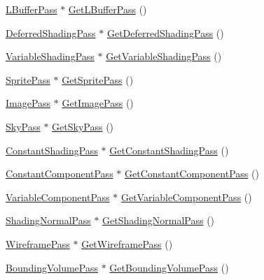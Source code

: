 \begin{DoxyCompactItemize}
\item 
\hyperlink{structmage_1_1_l_buffer_pass}{L\+Buffer\+Pass} $\ast$ \hyperlink{classmage_1_1_scene_renderer_a19c08ea8c46fac8ca0fcef156f4a0488}{Get\+L\+Buffer\+Pass} ()
\item 
\hyperlink{classmage_1_1_deferred_shading_pass}{Deferred\+Shading\+Pass} $\ast$ \hyperlink{classmage_1_1_scene_renderer_aa0a9b451bdb7b96672bece024f733178}{Get\+Deferred\+Shading\+Pass} ()
\item 
\hyperlink{classmage_1_1_variable_shading_pass}{Variable\+Shading\+Pass} $\ast$ \hyperlink{classmage_1_1_scene_renderer_a1eb6332a375e6f8273c26223c832d22c}{Get\+Variable\+Shading\+Pass} ()
\item 
\hyperlink{classmage_1_1_sprite_pass}{Sprite\+Pass} $\ast$ \hyperlink{classmage_1_1_scene_renderer_a5a7c407e308d6f449b8cbee08794d8bd}{Get\+Sprite\+Pass} ()
\item 
\hyperlink{classmage_1_1_image_pass}{Image\+Pass} $\ast$ \hyperlink{classmage_1_1_scene_renderer_a9bd8910a13b4711e90bdd689df8b4854}{Get\+Image\+Pass} ()
\item 
\hyperlink{classmage_1_1_sky_pass}{Sky\+Pass} $\ast$ \hyperlink{classmage_1_1_scene_renderer_a4084ba56458ae0678b0d970ceb87cbd0}{Get\+Sky\+Pass} ()
\item 
\hyperlink{classmage_1_1_constant_shading_pass}{Constant\+Shading\+Pass} $\ast$ \hyperlink{classmage_1_1_scene_renderer_a26f35273609c8850b37f2e78a7c4af32}{Get\+Constant\+Shading\+Pass} ()
\item 
\hyperlink{classmage_1_1_constant_component_pass}{Constant\+Component\+Pass} $\ast$ \hyperlink{classmage_1_1_scene_renderer_abc8019f567221458382aedabc4c1d651}{Get\+Constant\+Component\+Pass} ()
\item 
\hyperlink{classmage_1_1_variable_component_pass}{Variable\+Component\+Pass} $\ast$ \hyperlink{classmage_1_1_scene_renderer_a9537cbf602aa7bfa5f197812683bfb37}{Get\+Variable\+Component\+Pass} ()
\item 
\hyperlink{classmage_1_1_shading_normal_pass}{Shading\+Normal\+Pass} $\ast$ \hyperlink{classmage_1_1_scene_renderer_a5982de896a340dd69c26496f186a0094}{Get\+Shading\+Normal\+Pass} ()
\item 
\hyperlink{classmage_1_1_wireframe_pass}{Wireframe\+Pass} $\ast$ \hyperlink{classmage_1_1_scene_renderer_acaeae241945b630dab465533195faac9}{Get\+Wireframe\+Pass} ()
\item 
\hyperlink{classmage_1_1_bounding_volume_pass}{Bounding\+Volume\+Pass} $\ast$ \hyperlink{classmage_1_1_scene_renderer_a97f5c38b070497bd3737fc6ace775ef1}{Get\+Bounding\+Volume\+Pass} ()
\end{DoxyCompactItemize}
